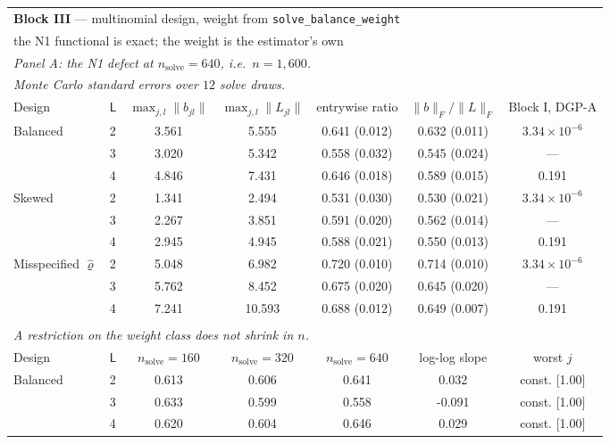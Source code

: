 \begin{tabular}{llccccc}
\toprule
\multicolumn{7}{l}{\textbf{Block III} --- multinomial design, weight from \texttt{solve\_balance\_weight}} \\
\multicolumn{7}{l}{\quad the N1 functional is exact; the weight is the estimator's own} \\
\midrule
\multicolumn{7}{l}{\textit{Panel A: the N1 defect at $n_{\mathrm{solve}}=640$, i.e.\ $n=1{,}600$.}} \\
\multicolumn{7}{l}{\textit{\quad Monte Carlo standard errors over $12$ solve draws.}} \\
\midrule
Design & $\mathsf L$ & $\max_{j,l}\|b_{jl}\|$ & $\max_{j,l}\|L_{jl}\|$ & entrywise ratio & $\|b\|_F/\|L\|_F$ & Block I, DGP-A \\
\midrule
Balanced & 2 & 3.561 & 5.555 & 0.641 (0.012) & 0.632 (0.011) & $3.34\times10^{-6}$ \\
 & 3 & 3.020 & 5.342 & 0.558 (0.032) & 0.545 (0.024) & --- \\
 & 4 & 4.846 & 7.431 & 0.646 (0.018) & 0.589 (0.015) & 0.191 \\
\addlinespace
Skewed & 2 & 1.341 & 2.494 & 0.531 (0.030) & 0.530 (0.021) & $3.34\times10^{-6}$ \\
 & 3 & 2.267 & 3.851 & 0.591 (0.020) & 0.562 (0.014) & --- \\
 & 4 & 2.945 & 4.945 & 0.588 (0.021) & 0.550 (0.013) & 0.191 \\
\addlinespace
Misspecified $\hat\varrho$ & 2 & 5.048 & 6.982 & 0.720 (0.010) & 0.714 (0.010) & $3.34\times10^{-6}$ \\
 & 3 & 5.762 & 8.452 & 0.675 (0.020) & 0.645 (0.020) & --- \\
 & 4 & 7.241 & 10.593 & 0.688 (0.012) & 0.649 (0.007) & 0.191 \\
\addlinespace
\multicolumn{7}{l}{\textit{Panel B: the entrywise ratio against the solve fold, $\lceil 0.4n\rceil$.}} \\
\multicolumn{7}{l}{\textit{\quad A restriction on the weight class does not shrink in $n$.}} \\
\midrule
Design & $\mathsf L$ & $n_{\mathrm{solve}}=160$ & $n_{\mathrm{solve}}=320$ & $n_{\mathrm{solve}}=640$ & log-log slope & worst $j$ \\
\midrule
Balanced & 2 & 0.613 & 0.606 & 0.641 & 0.032 & const. [1.00] \\
 & 3 & 0.633 & 0.599 & 0.558 & -0.091 & const. [1.00] \\
 & 4 & 0.620 & 0.604 & 0.646 & 0.029 & const. [1.00] \\

\end{tabular}
